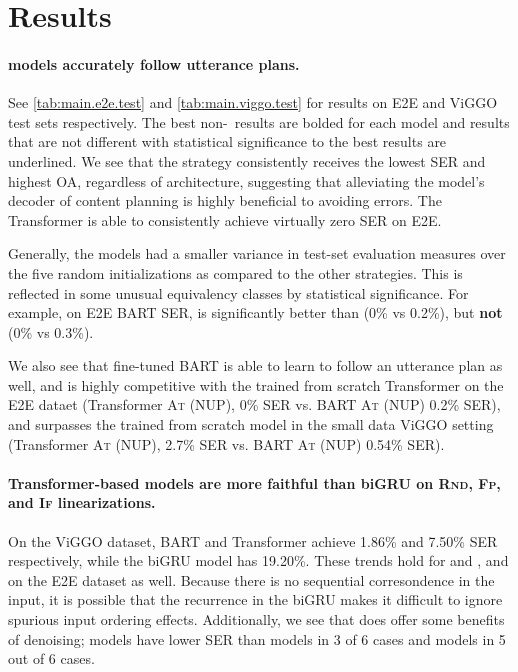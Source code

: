 \section{Results}


\paragraph{ models accurately follow utterance plans.} See
\autoref{tab:main.e2e.test} and \autoref{tab:main.viggo.test} for results on
E2E and ViGGO test sets respectively.  
{\color{red}The best non-\Oracle~results are bolded for each model and results
that are not different with statistical significance to the best results
are underlined.}
We see that the 
strategy consistently receives the lowest SER and highest OA, regardless of
architecture, suggesting that alleviating the model's decoder of content
planning is highly beneficial to avoiding errors. The Transformer  is able to consistently achieve virtually zero SER on E2E.

{\color{red}Generally, the  models had a smaller variance in test-set
evaluation measures over the five random initializations as compared to the
other strategies. This is reflected in some unusual equivalency classes
by statistical significance. For example, on E2E BART SER, 
 is significantly better than 
(0\% vs 0.2\%), but \textbf{not}  (0\% vs 0.3\%).}





We also see that fine-tuned BART is able to learn to follow an utterance plan
as well, and is highly competitive with the trained from scratch Transformer
on the E2E dataet (Transformer \textsc{At} (NUP), 0\% SER vs. BART
\textsc{At} (NUP) 0.2\% SER), and surpasses the trained from scratch model in
the small data ViGGO setting (Transformer \textsc{At} (NUP), 2.7\% SER vs.
BART \textsc{At} (NUP) 0.54\% SER). 

\paragraph{Transformer-based models are more faithful than biGRU on
\textsc{Rnd, Fp}, and \textsc{If} linearizations.} On the ViGGO dataset, BART
and Transformer  achieve 1.86\% and 7.50\% SER respectively, while
the biGRU  model has 19.20\%. These trends hold for 
and , and on the E2E dataset as well. Because there is no
sequential corresondence in the input, it is possible that the recurrence in
the biGRU makes it difficult to ignore spurious input ordering effects.
Additionally, we see that  does offer some benefits of denoising;
 models have lower SER than  models in 3 of 6 cases 
and  models in 5 out of 6 cases.


